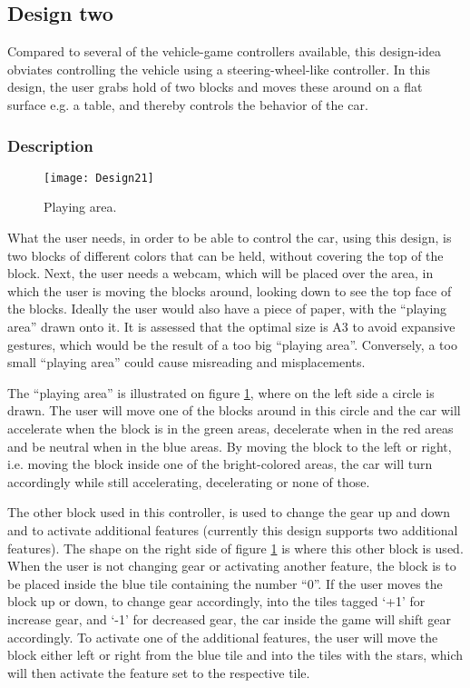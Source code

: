 \subsection{Design two}
\label{design2}
Compared to several of the vehicle-game controllers available, this design-idea obviates controlling the vehicle using a steering-wheel-like controller. In this design, the user grabs hold of two blocks and moves these around on a flat surface e.g. a table, and thereby controls the behavior of the car.

\subsubsection*{Description}

\begin{figure}[!htbp]
\centering
\texttt{[image: Design21]}
\caption{Playing area.}
\label{fig:design21}
\end{figure}

What the user needs, in order to be able to control the car, using this design, is two blocks of different colors that can be held, without covering the top of the block. Next, the user needs a webcam, which will be placed over the area, in which the user is moving the blocks around, looking down to see the top face of the blocks. Ideally the user would also have a piece of paper, with the “playing area” drawn onto it. It is assessed that the optimal size is A3 to avoid expansive gestures, which would be the result of a too big “playing area”. Conversely, a too small “playing area” could cause misreading and misplacements.
\bigskip

The “playing area” is illustrated on figure \ref{fig:design21}, where on the left side a circle is drawn. The user will move one of the blocks around in this circle and the car will accelerate when the block is in the green areas, decelerate when in the red areas and be neutral when in the blue areas. By moving the block to the left or right, i.e. moving the block inside one of the bright-colored areas, the car will turn accordingly while still accelerating, decelerating or none of those.

The other block used in this controller, is used to change the gear up and down and to activate additional features (currently this design supports two additional features). The shape on the right side of figure \ref{fig:design21} is where this other block is used. When the user is not changing gear or activating another feature, the block is to be placed inside the blue tile containing the number “0”. If the user moves the block up or down, to change gear accordingly, into the tiles tagged ‘+1’ for increase gear, and ‘-1’ for decreased gear, the car inside the game will shift gear accordingly. To activate one of the additional features, the user will move the block either left or right from the blue tile and into the tiles with the stars, which will then activate the feature set to the respective tile.

